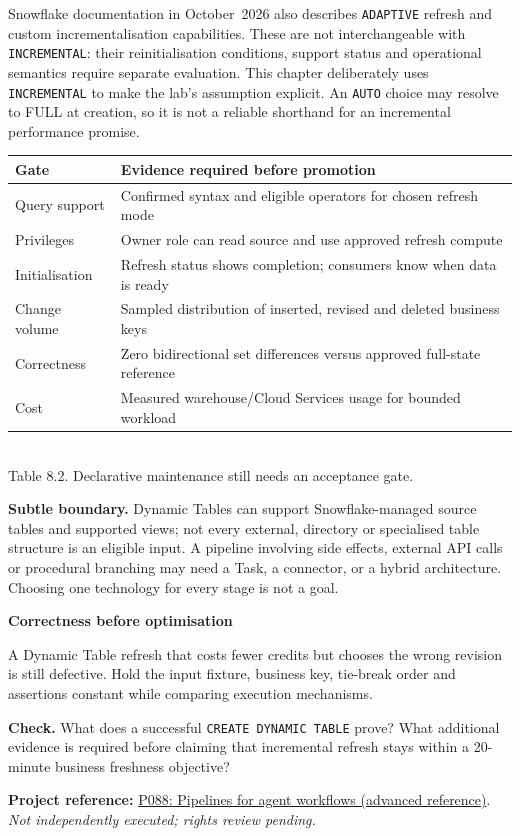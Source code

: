 \documentclass[11pt,twoside]{article}
\newcommand{\repo}[2]{\par\begingroup\fontsize{8.0}{9.6}\selectfont\sffamily\color{inkgray}\textbf{Project reference:} \href{#2}{#1}. \textit{Not independently executed; rights review pending.}\par\endgroup}
\begin{document}
Snowflake documentation in October~2026 also describes \texttt{ADAPTIVE} refresh and custom incrementalisation capabilities. These are not interchangeable with \texttt{INCREMENTAL}: their reinitialisation conditions, support status and operational semantics require separate evaluation. This chapter deliberately uses \texttt{INCREMENTAL} to make the lab's assumption explicit. An \texttt{AUTO} choice may resolve to FULL at creation, so it is not a reliable shorthand for an incremental performance promise.
\begin{center}\renewcommand{\arraystretch}{1.1}\begin{tabularx}{\linewidth}{@{}p{26mm}X@{}}\toprule
\textbf{Gate}&\textbf{Evidence required before promotion}\\\midrule
Query support&Confirmed syntax and eligible operators for chosen refresh mode\\
Privileges&Owner role can read source and use approved refresh compute\\
Initialisation&Refresh status shows completion; consumers know when data is ready\\
Change volume&Sampled distribution of inserted, revised and deleted business keys\\
Correctness&Zero bidirectional set differences versus approved full-state reference\\
Cost&Measured warehouse/Cloud Services usage for bounded workload\\\bottomrule
\end{tabularx}\\{\fontsize{8}{9.5}\selectfont\color{inkgray}Table 8.2. Declarative maintenance still needs an acceptance gate.}\end{center}
\textbf{Subtle boundary.} Dynamic Tables can support Snowflake-managed source tables and supported views; not every external, directory or specialised table structure is an eligible input. A pipeline involving side effects, external API calls or procedural branching may need a Task, a connector, or a hybrid architecture. Choosing one technology for every stage is not a goal.
\begin{insight}\textbf{Correctness before optimisation}\par
A Dynamic Table refresh that costs fewer credits but chooses the wrong revision is still defective. Hold the input fixture, business key, tie-break order and assertions constant while comparing execution mechanisms.\end{insight}
\textbf{Check.} What does a successful \texttt{CREATE DYNAMIC TABLE} prove? What additional evidence is required before claiming that incremental refresh stays within a 20-minute business freshness objective?
\repo{P088: Pipelines for agent workflows (advanced reference)}{https://github.com/Snowflake-Labs/sfguide-build-autonomous-pipelines-for-ai-agents}
\newpage
\end{document}
